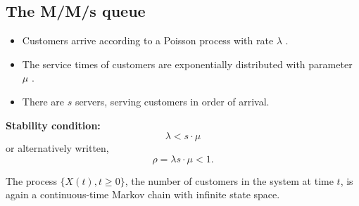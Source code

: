 



\subsection*{The M/M/s queue}
\begin{itemize}
\item  Customers arrive according to a Poisson process with rate $\lambda$ .
\item  The service times of customers are exponentially distributed with parameter $\mu$ .
\item  There are $s$ servers, serving customers in order of arrival.
\end{itemize}

\noindent \textbf{Stability condition:}
\[\lambda  < s\cdot \mu\]  or alternatively written, 
\[\rho = \lambda s\cdot \mu < 1.\]

The process $\{X(t), t \geq  0\}$, the number of customers in the system at time
$t$, is again a continuous-time Markov chain with infinite state space.

